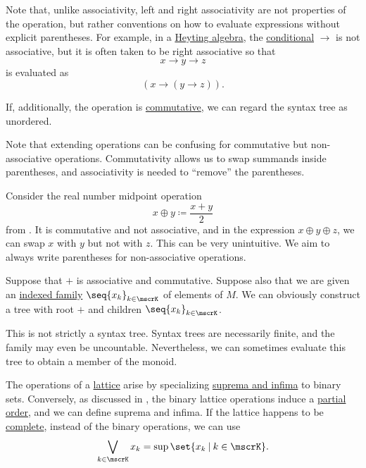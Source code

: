 \begin{remark}
\begin{thmenum}
    Note that, unlike associativity, left and right associativity are not properties of the operation, but rather conventions on how to evaluate expressions without explicit parentheses. For example, in a \hyperref[def:heyting_algebra]{Heyting algebra}, the \hyperref[eq:def:heyting_algebra/conditional]{conditional} \( \rightarrow \) is not associative, but it is often taken to be right associative so that
    \begin{equation*}
      x \rightarrow y \rightarrow z
    \end{equation*}
    is evaluated as
    \begin{equation*}
      (x \rightarrow (y \rightarrow z)).
    \end{equation*}

     If, additionally, the operation is \hyperref[def:magma/commutative]{commutative}, we can regard the syntax tree as unordered.

    Note that extending operations can be confusing for commutative but non-associative operations. Commutativity allows us to swap summands inside parentheses, and associativity is needed to \enquote{remove} the parentheses.

    Consider the real number midpoint operation
    \begin{equation*}
      x \oplus y \coloneqq \frac {x + y} 2
    \end{equation*}
    from . It is commutative and not associative, and in the expression \( x \oplus y \oplus z \), we can swap \( x \) with \( y \) but not with \( z \). This can be very unintuitive. We aim to always write parentheses for non-associative operations.

     Suppose that \( + \) is associative and commutative. Suppose also that we are given an \hyperref[def:cartesian_product/indexed_family]{indexed family} \( \seq{ x_k }_{k \in \mscrK} \) of elements of \( M \). We can obviously construct a tree with root \( + \) and children \( \seq{ x_k }_{k \in \mscrK} \).

    This is not strictly a syntax tree. Syntax trees are necessarily finite, and the family may even be uncountable. Nevertheless, we can sometimes evaluate this tree to obtain a member of the monoid.
    \begin{thmenum}
       The operations of a \hyperref[def:semilattice/lattice]{lattice} arise by specializing \hyperref[def:partially_ordered_set_extremal_points/supremum_and_infimum]{suprema and infima} to binary sets. Conversely, as discussed in , the binary lattice operations induce a \hyperref[def:partially_ordered_set]{partial order}, and we can define suprema and infima. If the lattice happens to be \hyperref[def:semilattice/complete]{complete}, instead of the binary operations, we can use
      \begin{equation*}
        \bigvee_{k \in \mscrK} x_k = \sup\set{ x_k \given k \in \mscrK }.
      \end{equation*}


\end{thmenum}
\end{thmenum}
\end{remark}
